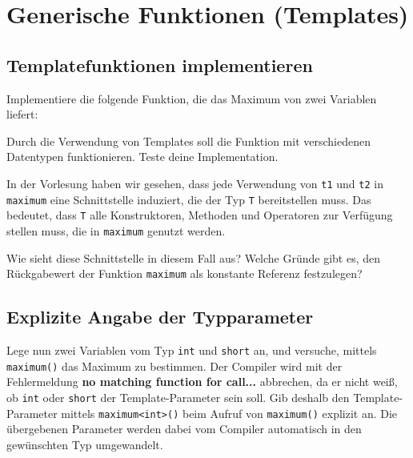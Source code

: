 \section{\ExercisePrefixAdvanced Generische Funktionen (Templates)}
\subsection{Templatefunktionen implementieren}
Implementiere die folgende Funktion, die das Maximum von zwei Variablen liefert:


Durch die Verwendung von Templates soll die Funktion mit verschiedenen Datentypen funktionieren.
Teste deine Implementation.

In der Vorlesung haben wir gesehen, dass jede Verwendung von \lstinline{t1} und \lstinline{t2} in \lstinline{maximum} eine Schnittstelle induziert, die der Typ \lstinline{T} bereitstellen muss.
Das bedeutet, dass \lstinline{T} alle Konstruktoren, Methoden und Operatoren zur Verfügung stellen muss, die in \lstinline{maximum} genutzt werden.

Wie sieht diese Schnittstelle in diesem Fall aus?
Welche Gründe gibt es, den Rückgabewert der Funktion \lstinline{maximum} als konstante Referenz festzulegen?


\subsection{Explizite Angabe der Typparameter}
Lege nun zwei Variablen vom Typ \lstinline{int} und \lstinline{short} an, und versuche, mittels \lstinline{maximum()} das Maximum zu bestimmen.
Der Compiler wird mit der Fehlermeldung \textbf{no matching function for call...} abbrechen, da er nicht weiß, ob \lstinline{int} oder \lstinline{short} der Template-Parameter sein soll.
Gib deshalb den Template-Parameter mittels \lstinline{maximum<int>()} beim Aufruf von \lstinline{maximum()} explizit an.
Die übergebenen Parameter werden dabei vom Compiler automatisch in den gewünschten Typ umgewandelt.

